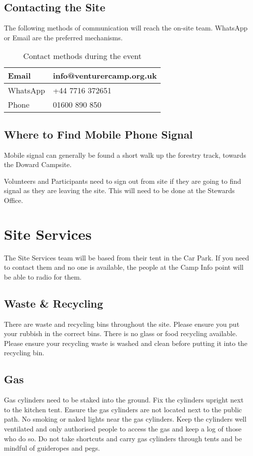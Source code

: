 \documentclass[a4paper, 11pt]{report}
\begin{document}
\section{Contacting the Site}
The following methods of communication will reach the on-site team. WhatsApp or Email are the preferred mechanisms.
\begin{table}[H]
    \centering
    \begin{tabular}{p{} p{}}
        \hline
        Email & info@venturercamp.org.uk\\
        \hline
        WhatsApp & +44 7716 372651\\
        \hline
        Phone & 01600 890 850\\
        \hline
    \end{tabular}
    \caption{Contact methods during the event}
\end{table}

\section{Where to Find Mobile Phone Signal}
Mobile signal can generally be found a short walk up the forestry track, towards the Doward Campsite.\nl

Volunteers and Participants need to sign out from site if they are going to find signal as they are leaving the site. This will need to be done at the Stewards Office.

\chapter{Site Services}
The Site Services team will be based from their tent in the Car Park. If you need to contact them and no one is available, the people at the Camp Info point will be able to radio for them. 

\section{Waste \& Recycling}
There are waste and recycling bins throughout the site. Please ensure you put your rubbish in the correct bins. There is no glass or food recycling available. Please ensure your recycling waste is washed and clean before putting it into the recycling bin. 

\section{Gas}
Gas cylinders need to be staked into the ground. Fix the cylinders upright next to the kitchen tent. Ensure the gas cylinders are not located next to the public path. No smoking or naked lights near the gas cylinders. Keep the cylinders well ventilated and only authorised people to access the gas and keep a log of those who do so. Do not take shortcuts and carry gas cylinders through tents and be mindful of guideropes and pegs.\nl
\end{document}
